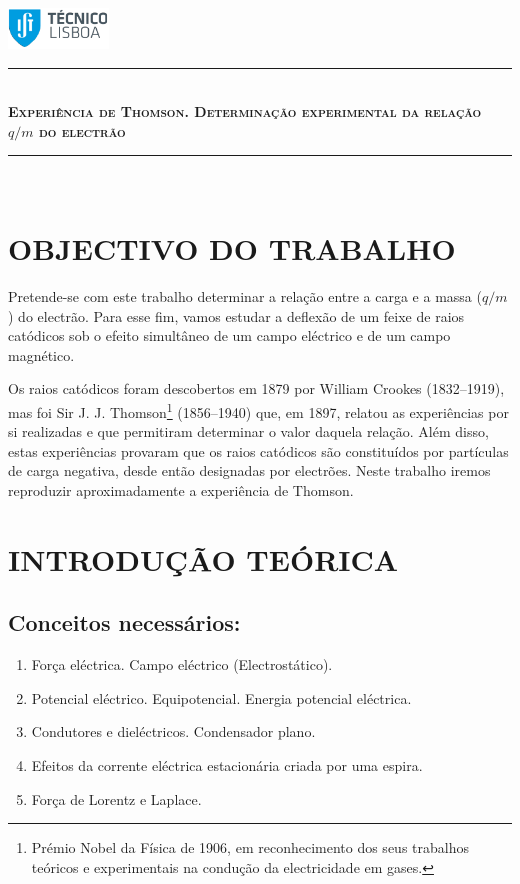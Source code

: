 \documentclass[a4paper,twoside,12pt]{article}      %
\author{Prof. Bernardo B. Carvalho}
\date{ Setembro 2014}
\newcommand{\HRule}{\rule{\linewidth}{0.5mm}}
\begin{document}
 

\includegraphics[width=0.2\textwidth]{../../logo-ist}%

\HRule \\[0.5cm]
{ \large   \bfseries \textsc{ Experiência de Thomson. Determinação experimental da relação $q/m$ do electrão }}\\
\HRule \\%

\section{\sf OBJECTIVO DO TRABALHO}
Pretende-se com este trabalho determinar a relação entre a carga e a massa ($q/m$) do electrão. Para esse fim, vamos estudar a deflexão de um feixe de raios catódicos sob o efeito simultâneo de um campo eléctrico e de um campo magnético.

Os raios catódicos foram descobertos em 1879 por William Crookes (1832--1919), mas foi Sir J. J. Thomson\footnote{Prémio Nobel da Física de 1906, em reconhecimento dos seus trabalhos teóricos e experimentais na condução da electricidade em gases.} (1856--1940) que, em 1897, relatou as experiências por si realizadas e que permitiram determinar o valor daquela relação. Além disso, estas experiências provaram que os raios catódicos são constituídos por partículas de carga negativa, desde então designadas por electrões. Neste trabalho iremos reproduzir aproximadamente a experiência de Thomson.

\section{\sf INTRODUÇÃO TEÓRICA}
\subsection{\sf  Conceitos necessários:} 
\begin{enumerate}
	\item Força eléctrica. Campo eléctrico (Electrostático).
	\item Potencial eléctrico. Equipotencial. Energia potencial eléctrica.
	\item Condutores e dieléctricos. Condensador plano.
	\item Efeitos da corrente eléctrica estacionária criada por uma espira. 	
	\item Força de Lorentz e Laplace.
\end{enumerate}
\end{document}
